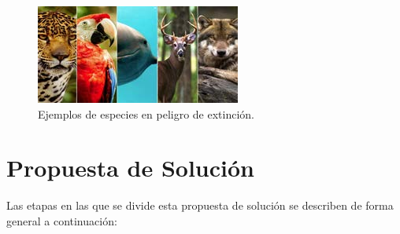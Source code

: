  \begin{figure} [h]
     \centering
     \includegraphics[width=0.5\linewidth]{imagenes/img1_ejemplos_especies_peligro_extincion.jpg}
     \caption{Ejemplos de especies en peligro de extinción.}
     \label{fig:enter-label}
 \end{figure}
\newpage
\chapter{Propuesta de Solución}
Las etapas en las que se divide esta propuesta de solución se describen de forma general a continuación:

